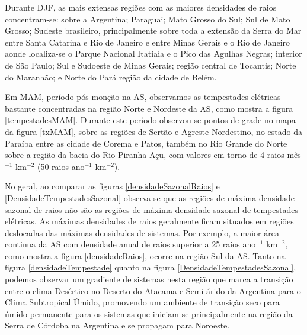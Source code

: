 Durante DJF, as mais extensas regiões com as maiores densidades de raios concentram-se: sobre a Argentina; Paraguai; Mato Grosso do Sul; Sul de Mato Grosso; Sudeste brasileiro, principalmente sobre toda a extensão da Serra do Mar entre Santa Catarina e Rio de Janeiro e entre Minas Gerais e o Rio de Janeiro aonde localiza-se o Parque Nacional Itatiaia e o Pico das Agulhas Negras; interior de São Paulo; Sul e Sudoeste de Minas Gerais; região central de Tocantis; Norte do Maranhão; e Norte do Pará região da cidade de Belém.


Em MAM, período pós-monção na AS, observamos as tempestades elétricas bastante concentradas na região Norte e Nordeste da AS, como mostra a figura \ref{tempestadesMAM}. Durante este período observou-se pontos de grade no mapa da figura \ref{txMAM}, sobre as regiões de Sertão e Agreste Nordestino, no estado da Paraíba entre as cidade de Corema e Patos, também no Rio Grande do Norte sobre a região da bacia do Rio Piranha-Açu, com valores em torno de 4 raios mês$^{-1}$ km$^{-2}$ (50 raios ano$^{-1}$ km$^{-2}$).



No geral, ao comparar as figuras \ref{densidadeSazonalRaios} e \ref{DensidadeTempestadesSazonal} observa-se que as regiões de máxima densidade sazonal de raios não são as regiões de máxima densidade sazonal de tempestades elétricas. As máximas densidades de raios geralmente ficam situados em regiões deslocadas das máximas densidades de sistemas. Por exemplo, a maior área continua da AS com densidade anual de raios superior a 25 raios ano$^{-1}$ km$^{-2}$, como mostra a figura \ref{densidadeRaios}, ocorre na região Sul da AS. Tanto na figura \ref{densidadeTempestade} quanto na figura \ref{DensidadeTempestadesSazonal}, podemos observar um  gradiente de sistemas nesta região que marca a transição entre o clima Desértico no Deserto do Atacama e Semi-árido da Argentina para o Clima Subtropical Úmido, promovendo um ambiente de transição seco para úmido permanente para os sistemas que iniciam-se principalmente na região da Serra de Córdoba na Argentina e se propagam para Noroeste.

